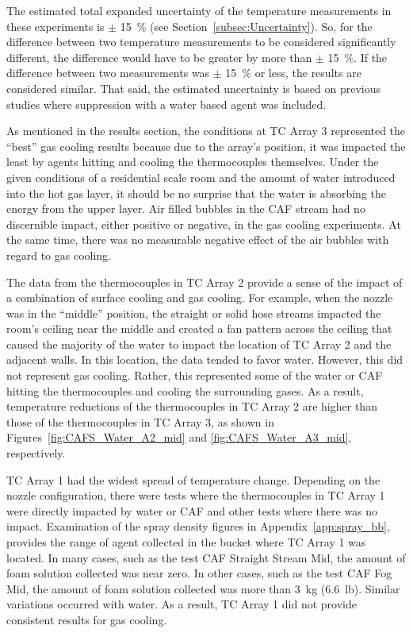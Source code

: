 \documentclass[12pt,oneside]{book}
\begin{document}
The estimated total expanded uncertainty of the temperature measurements in these experiments is $\pm$ 15~\% (see Section~\ref{subsec:Uncertainty}). So, for the difference between two temperature measurements to be considered significantly different, the difference would have to be greater by more than $\pm$ 15~\%. If the difference between two measurements was $\pm$ 15~\% or less, the results are considered similar. That said, the estimated uncertainty is based on previous studies where suppression with a water based agent was included.

As mentioned in the results section, the conditions at TC Array 3 represented the ``best'' gas cooling results because due to the array's position, it was impacted the least by agents hitting and cooling the thermocouples themselves. Under the given conditions of a residential scale room and the amount of water introduced into the hot gas layer, it should be no surprise that the water is absorbing the energy from the upper layer. Air filled bubbles in the CAF stream had no discernible impact, either positive or negative, in the gas cooling experiments. At the same time, there was no measurable negative effect of the air bubbles with regard to gas cooling.

The data from the thermocouples in TC Array 2 provide a sense of the impact of a combination of surface cooling and gas cooling. For example, when the nozzle was in the ``middle'' position, the straight or solid hose streams impacted the room's ceiling near the middle and created a fan pattern across the ceiling that caused the majority of the water to impact the location of TC Array 2 and the adjacent walls. In this location, the data tended to favor water. However, this did not represent gas cooling. Rather, this represented some of the water or CAF hitting the thermocouples and cooling the surrounding gases. As a result, temperature reductions of the thermocouples in TC Array 2 are higher than those of the thermocouples in TC Array 3, as shown in Figures~\ref{fig:CAFS_Water_A2_mid} and \ref{fig:CAFS_Water_A3_mid}, respectively.

TC Array 1 had the widest spread of temperature change. Depending on the nozzle configuration, there were tests where the thermocouples in TC Array 1 were directly impacted by water or CAF and other tests where there was no impact. Examination of the spray density figures in Appendix~\ref{app:spray_bb}, provides the range of agent collected in the bucket where TC Array 1 was located. In many cases, such as the test CAF Straight Stream Mid, the amount of foam solution collected was near zero. In other cases, such as the test CAF Fog Mid, the amount of foam solution collected was more than 3~kg (6.6~lb). Similar variations occurred with water. As a result, TC Array 1 did not provide consistent results for gas cooling.  
\end{document}
